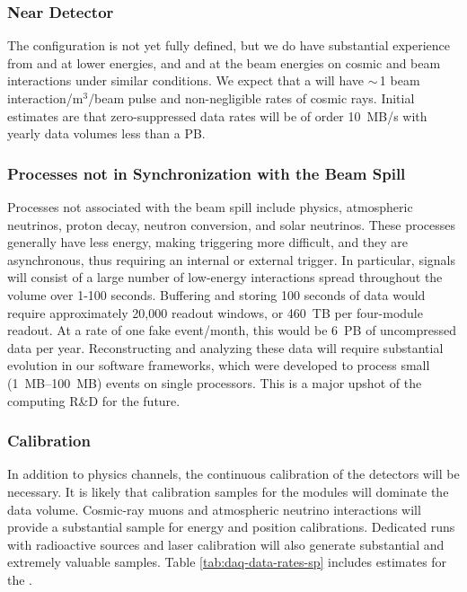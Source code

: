 \subsubsection{Near Detector} 
\label{sec:exec-comp-dt-nd}

The  configuration is not yet fully defined,  but we do have substantial experience from  and   at lower energies, and   and  at the   beam energies on cosmic and beam interactions under similar conditions.  We expect that a  will have $\sim\,$1 beam interaction/m$^3$/beam pulse and non-negligible rates of cosmic rays. Initial estimates are that zero-suppressed data rates will be of order \SI{10}{MB/s} with yearly data volumes less than a PB.  

\subsubsection{Processes not in Synchronization with the Beam Spill} 
\label{sec:exec-comp-dt-psbs}

Processes not associated with the beam spill %
include  physics, atmospheric neutrinos, proton decay, neutron conversion, and solar neutrinos.  These processes generally have less energy, making triggering more difficult, and they are  asynchronous, thus requiring an internal or external trigger.  In particular,  signals will consist of a large number of low-energy interactions spread throughout the  volume over 1-100 seconds. Buffering and storing 100 seconds of data would require approximately 20,000 readout windows, or \SI{460}{TB} per four-module  readout.  At a rate of one fake  event/month, this would be \SI{6}{PB} of uncompressed data per year.  Reconstructing and analyzing these data will require substantial evolution in our software frameworks, which were developed to process small (\SIrange{1}{100}{MB}) events on single processors. This is a major upshot of the  computing R\&D for the future. 

\subsubsection{Calibration}
\label{sec:exec-comp-cal}

In addition to physics channels, the continuous calibration of the detectors will be necessary.  It is likely that calibration samples for the  modules will dominate the data volume. Cosmic-ray muons and atmospheric neutrino interactions will provide a substantial sample for energy and position calibrations.  Dedicated runs with radioactive sources and laser calibration will also generate substantial and extremely valuable samples. Table \ref{tab:daq-data-rates-sp} includes estimates for the %
. 

